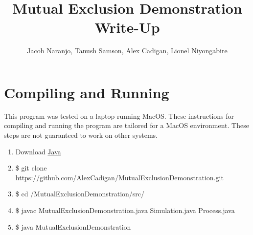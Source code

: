 \documentclass [11pt] {article}
\title {Mutual Exclusion Demonstration Write-Up}
\author {Jacob Naranjo, Tanush Samson, Alex Cadigan, Lionel Niyongabire}
\begin{document}
	\maketitle
	\section {Compiling and Running}
	This program was tested on a laptop running MacOS.  These instructions for compiling and running the program are tailored for a MacOS environment.  These steps are not guaranteed to work on other systems.
	\begin {enumerate}
		\item Download \href {http://www.oracle.com/technetwork/java/javase/downloads/index.html} {Java}
  		\item \$ git clone https://github.com/AlexCadigan/MutualExclusionDemonstration.git
		\item \$ cd /MutualExclusionDemonstration/src/
		\item \$ javac MutualExclusionDemonstration.java Simulation.java Process.java
		\item \$ java MutualExclusionDemonstration
	\end {enumerate}
\end{document}
